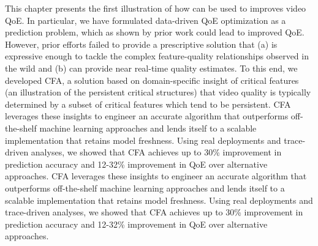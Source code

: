 This chapter presents the first illustration of how \ddn can be used
to improves video QoE. 
In particular, we have formulated data-driven QoE optimization as 
a prediction problem, which as shown by prior work could lead to 
improved QoE. However, prior efforts failed to provide a prescriptive 
solution that (a) is expressive enough to tackle the complex
feature-quality relationships observed in the wild and (b)
can provide near real-time quality estimates. To this end,
we developed CFA, a solution based on domain-specific
insight of critical features (an illustration of the persistent critical structures)
that video quality is typically determined by a
subset of critical features which tend to be persistent.
CFA leverages these insights to engineer an accurate algorithm
that outperforms off-the-shelf machine learning
approaches and lends itself to a scalable implementation
that retains model freshness. Using real deployments and
trace-driven analyses, we showed that CFA achieves up
to 30\% improvement in prediction accuracy and 12-32\%
improvement in QoE over alternative approaches.
%
CFA leverages these insights to engineer an accurate algorithm
that outperforms off-the-shelf machine learning
approaches and lends itself to a scalable implementation
that retains model freshness. Using real deployments and
trace-driven analyses, we showed that CFA achieves up
to 30\% improvement in prediction accuracy and 12-32\%
improvement in QoE over alternative approaches.




